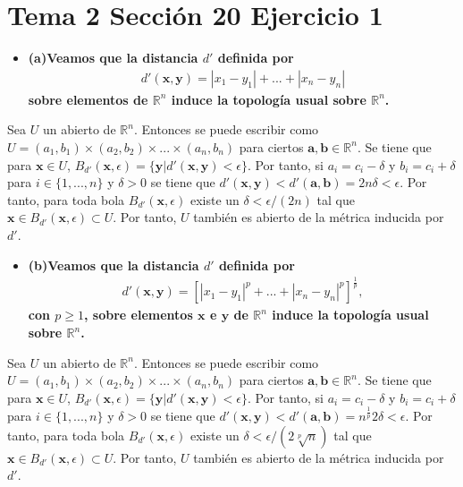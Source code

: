 \documentclass{article}
\newcommand{\vect}[1]{\boldsymbol{#1}}
\begin{document}
\section{Tema 2 Sección 20 Ejercicio 1}
\begin{itemize}
\item \bf(a)\rm  Veamos que la distancia $d'$ definida por 
\begin{eqnarray}
d'(\vect{x},\vect{y})= |x_1-y_1|+...+|x_n-y_n|
\end{eqnarray}
sobre elementos de $\mathbb{R}^n$ induce la topología usual sobre $\mathbb{R}^n$.
\end{itemize}
Sea $U$ un abierto de $\mathbb{R}^n$. Entonces se puede escribir como $U=(a_1,b_1)\times (a_2,b_2)\times...\times(a_n,b_n)$ para ciertos $\vect{a},\vect{b}\in \mathbb{R}^n$. Se tiene que para $\vect{x}\in U$, $B_{d'}(\vect{x},\epsilon)=\{\vect{y}|d'(\vect{x},\vect{y})<\epsilon\}$. Por tanto, si $a_i=c_i-\delta$ y $b_i=c_i+\delta$ para $i\in\{1,...,n\}$ y $\delta>0$
se tiene que $d'(\vect{x},\vect{y})<d'(\vect{a},\vect{b})=2n\delta<\epsilon$. Por tanto, para toda bola $B_{d'}(\vect{x},\epsilon)$ existe un $\delta<\epsilon/(2n)$ tal que $\vect{x}\in B_{d'}(\vect{x},\epsilon)\subset U$. Por tanto, $U$ también es abierto de la métrica inducida por $d'$.
\begin{itemize}
\item \bf(b)\rm  Veamos que la distancia $d'$ definida por 
\begin{eqnarray}
d'(\vect{x},\vect{y})=\left[|x_1-y_1|^p+...+|x_n-y_n|^p\right]^{\frac{1}{p}},\nonumber
\end{eqnarray}
con $p\geq 1$, sobre elementos $\vect{x}$ e $\vect{y}$ de $\mathbb{R}^n$ induce la topología usual sobre $\mathbb{R}^n$.
\end{itemize}
Sea $U$ un abierto de $\mathbb{R}^n$. Entonces se puede escribir como $U=(a_1,b_1)\times (a_2,b_2)\times...\times(a_n,b_n)$ para ciertos $\vect{a},\vect{b}\in \mathbb{R}^n$. Se tiene que para $\vect{x}\in U$, $B_{d'}(\vect{x},\epsilon)=\{\vect{y}|d'(\vect{x},\vect{y})<\epsilon\}$. Por tanto, si $a_i=c_i-\delta$ y $b_i=c_i+\delta$ para $i\in\{1,...,n\}$ y $\delta>0$
se tiene que $d'(\vect{x},\vect{y})<d'(\vect{a},\vect{b})=n^{\frac{1}{p}}2\delta<\epsilon$. Por tanto, para toda bola $B_{d'}(\vect{x},\epsilon)$ existe un $\delta<\epsilon/(2\sqrt[p]{n})$ tal que $\vect{x}\in B_{d'}(\vect{x},\epsilon)\subset U$. Por tanto, $U$ también es abierto de la métrica inducida por $d'$.
\end{document}
